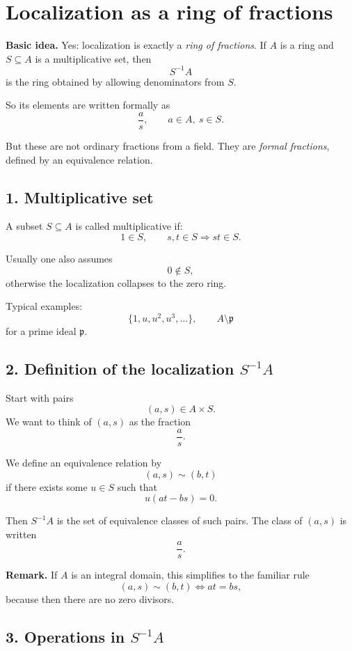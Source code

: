 \documentclass[12pt,a4paper]{article}
\theoremstyle{notespace}
\begin{document}
\section{Localization as a ring of fractions}

\textbf{Basic idea.}
Yes: localization is exactly a \emph{ring of fractions}. If \(A\) is a ring and \(S\subseteq A\) is a multiplicative set, then
\[
S^{-1}A
\]
is the ring obtained by allowing denominators from \(S\).

So its elements are written formally as
\[
\frac{a}{s},
\qquad a\in A,\ s\in S.
\]

But these are not ordinary fractions from a field. They are \emph{formal fractions}, defined by an equivalence relation.

\subsection{1. Multiplicative set}

A subset \(S\subseteq A\) is called multiplicative if:
\[
1\in S,
\qquad
s,t\in S \Rightarrow st\in S.
\]

Usually one also assumes
\[
0\notin S,
\]
otherwise the localization collapses to the zero ring.

Typical examples:
\[
\{1,u,u^2,u^3,\dots\},
\qquad
A\setminus \mathfrak p
\]
for a prime ideal \(\mathfrak p\).

\subsection{2. Definition of the localization \(S^{-1}A\)}

Start with pairs
\[
(a,s)\in A\times S.
\]
We want to think of \((a,s)\) as the fraction
\[
\frac{a}{s}.
\]

We define an equivalence relation by
\[
(a,s)\sim (b,t)
\]
if there exists some \(u\in S\) such that
\[
u(at-bs)=0.
\]

Then \(S^{-1}A\) is the set of equivalence classes of such pairs. The class of \((a,s)\) is written
\[
\frac{a}{s}.
\]

\textbf{Remark.}
If \(A\) is an integral domain, this simplifies to the familiar rule
\[
(a,s)\sim (b,t)
\iff at=bs,
\]
because then there are no zero divisors.

\subsection{3. Operations in \(S^{-1}A\)}
\end{document}
